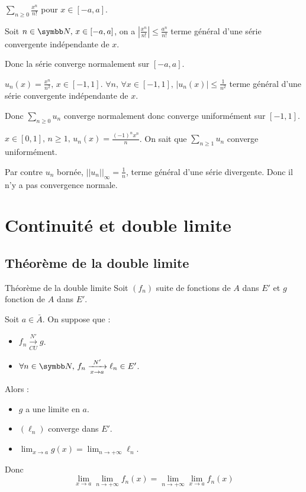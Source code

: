 \begin{exemple}
    $\displaystyle \sum_{n \geqslant 0 } \frac{x^n }{n!}$ pour $x \in [-a, a]$. 

    Soit $n \in \N, \, x \in [-a, a]$, on a $\left| \frac{x^n }{n !} \right| \leqslant \frac{a^n }{n!}$ 
    terme général d'une série convergente indépendante de $x$.

    Donc la série converge normalement sur $[-a, a]$.

    \lvspace $u_n(x) = \frac{x^n }{n^2}, \, x \in [-1, 1]$. $\forall n, \, \forall x \in [-1, 1], \, |u_n(x)| \leqslant \frac{1 }{n^2}$
    terme général d'une série convergente indépendante de $x$.

    Donc $\displaystyle \sum_{n \geqslant 0} u_n$ converge normalement donc converge uniformément sur $[-1, 1]$.

    \lvspace $\displaystyle x \in [0, 1], \, n \geqslant 1, \, u_n(x) = \frac{(-1)^n x^n} n$. On sait que 
    $\displaystyle \sum_{n \geqslant 1} u_n$ converge uniformément. 

    Par contre  $u_n$ bornée, $||u_n||_{\infty} = \frac 1 n$, terme général d'une série divergente. Donc il 
    n'y a pas convergence normale.
\end{exemple}


\section{Continuité et double limite}
\subsection{Théorème de la double limite} 

\begin{theoreme}{Théorème de la double limite}{}
    Soit $(f_n)$ suite de fonctions de $A$ dans $E'$ et $g$ fonction de $A$ dans $E'$.

    Soit $a \in \bar A$. On suppose que : 
    \begin{itemize}
        \item $f_n \xrightarrow[CU]{N'} g$.
        \item $\forall n \in \N, \, f_n \xrightarrow[x \to a]{N'} \ell_n \in E'$.
    \end{itemize}

    Alors : 
    \begin{itemize}
        \item $g$ a une limite en $a$.
        \item $(\ell_n)$ converge dans $E'$.
        \item $\displaystyle \lim_{x \to a} g(x) = \lim_{n \to +\infty} \ell_n$.
    \end{itemize}

    Donc \[\lim_{x \to a} \lim_{n \to +\infty} f_n(x) = \lim_{n \to +\infty} \lim_{x \to a} f_n(x)\]
\end{theoreme}

